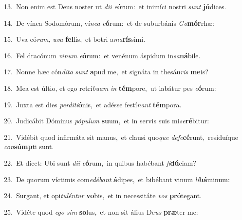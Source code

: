 {\numbfont\textcolor{\numbcolor}{13.}}~Non enim est Deus noster ut \textit{di}\-\textit{i} \textit{e}\-\textbf{ó}rum:~\star et inimíci nostri \textit{sunt} \textbf{jú}\-dices.\par
{\numbfont\textcolor{\numbcolor}{14.}}~De vínea Sodomórum, ví\-\textit{ne}\-\textit{a} \textit{e}\-\textbf{ó}rum:~\star et de suburbánis \textit{Go}\-\textbf{mór}rhæ:\par
{\numbfont\textcolor{\numbcolor}{15.}}~Uva eó\-\textit{rum}\-, \textit{u}\-\textit{va} \textbf{fel}\-lis,~\star et botri a\-\textit{ma}\-\textbf{rís}simi.\par
{\numbfont\textcolor{\numbcolor}{16.}}~Fel dracónum \textit{vi}\-\textit{num} \textit{e}\-\textbf{ó}rum:~\star et venénum áspidum in\-\textit{sa}\-\textbf{ná}bile.\par
{\numbfont\textcolor{\numbcolor}{17.}}~Nonne hæc cón\-\textit{di}\-\textit{ta} \textit{sunt} \textbf{a}\-pud me,~\star et signáta in thesáu\textit{ris} \textbf{me}\-is?\par
{\numbfont\textcolor{\numbcolor}{18.}}~Mea est últio, et ego retrí\-\textit{bu}\-\textit{am} \textit{in} \textbf{tém}\-pore,~\star ut labátur pes \textit{e}\-\textbf{ó}rum:\par
{\numbfont\textcolor{\numbcolor}{19.}}~Juxta est dies \textit{per}\-\textit{di}\textit{ti}\textbf{ó}nis,~\star et adésse festí\textit{nant} \textbf{tém}\-pora.\par
{\numbfont\textcolor{\numbcolor}{20.}}~Judicábit Dóminus \textit{pó}\-\textit{pu}\textit{lum} \textbf{su}\-um,~\star et in servis suis mi\-\textit{se}\-\textbf{ré}bitur:\par
{\numbfont\textcolor{\numbcolor}{21.}}~Vidébit quod infirmáta sit manus,~\dagger et clausi quo\textit{que} \textit{de}\-\textit{fe}\textbf{cé}runt,~\star residuíque \textit{con}\-\textbf{súmp}ti sunt.\par
{\numbfont\textcolor{\numbcolor}{22.}}~Et dicet: Ubi sunt \textit{di}\-\textit{i} \textit{e}\-\textbf{ó}rum,~\star in quibus habébant \textit{fi}\-\textbf{dú}ciam?\par
{\numbfont\textcolor{\numbcolor}{23.}}~De quorum víctimis com\-\textit{e}\-\textit{dé}\textit{bant} \textbf{á}\-dipes,~\star et bibébant vinum \textit{li}\-\textbf{bá}minum:\par
{\numbfont\textcolor{\numbcolor}{24.}}~Surgant, et opi\-\textit{tu}\-\textit{lén}\textit{tur} \textbf{vo}\-bis,~\star et in necessitáte \textit{vos} \textbf{pró}\-tegant.\par
{\numbfont\textcolor{\numbcolor}{25.}}~Vidéte quod \textit{e}\-\textit{go} \textit{sim} \textbf{so}\-lus,~\star et non sit álius De\textit{us} \textbf{præ}\-ter me:\par
